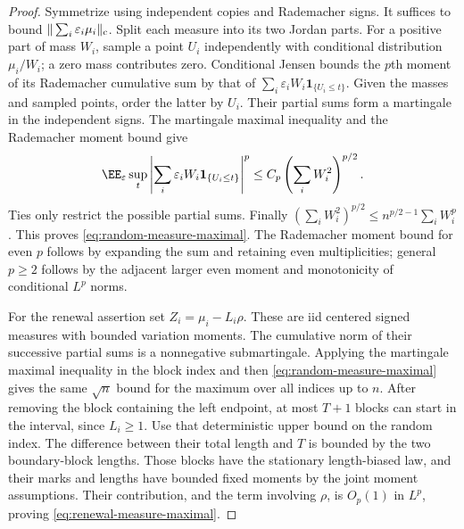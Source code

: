 \documentclass[11pt,letterpaper]{article}
\newcommand{\ind}{\mathbf 1}\newcommand{\Exp}{\operatorname{Exp}}
\begin{document}
\begin{proof}
Symmetrize using independent copies and Rademacher signs.
It suffices to bound $\|\sum_i\varepsilon_i\mu_i\|_{\rm c}$.
Split each measure into its two Jordan parts. For a positive
part of mass $W_i$, sample a point $U_i$ independently with
conditional distribution $\mu_i/W_i$; a zero mass contributes zero.
Conditional Jensen bounds the $p$th moment of its Rademacher
cumulative sum by that of
$\sum_i\varepsilon_iW_i\ind_{\{U_i\le t\}}$.
Given the masses and sampled points, order the latter by $U_i$.
Their partial sums form a martingale in the independent signs.
The martingale maximal inequality and the Rademacher moment
bound give
\[
 \EE_\varepsilon\sup_t
       \left|\sum_i\varepsilon_iW_i\ind_{\{U_i\le t\}}\right|^p
       \le C_p\left(\sum_iW_i^2\right)^{p/2}.
\]
Ties only restrict the possible partial sums. Finally
$(\sum_iW_i^2)^{p/2}\le n^{p/2-1}\sum_iW_i^p$.
This proves \eqref{eq:random-measure-maximal}.
The Rademacher moment bound for even $p$ follows by expanding
the sum and retaining even multiplicities; general $p\ge2$
follows by the adjacent larger even moment and monotonicity
of conditional $L^p$ norms.

For the renewal assertion set $Z_i=\mu_i-L_i\rho$.
These are iid centered signed measures with bounded variation
moments. The cumulative norm of their successive partial sums
is a nonnegative submartingale. Applying the martingale maximal
inequality in the block index and then
\eqref{eq:random-measure-maximal} gives the same $\sqrt n$ bound
for the maximum over all indices up to $n$.
After removing the block containing the left endpoint, at most
$T+1$ blocks can start in the interval, since $L_i\ge1$.
Use that deterministic upper bound on the random index.
The difference between their total length and $T$ is bounded
by the two boundary-block lengths. Those blocks have the
stationary length-biased law, and their marks and lengths have
bounded fixed moments by the joint moment assumptions.
Their contribution, and the term involving $\rho$, is $O_p(1)$
in $L^p$, proving \eqref{eq:renewal-measure-maximal}.
\end{proof}
\end{document}
